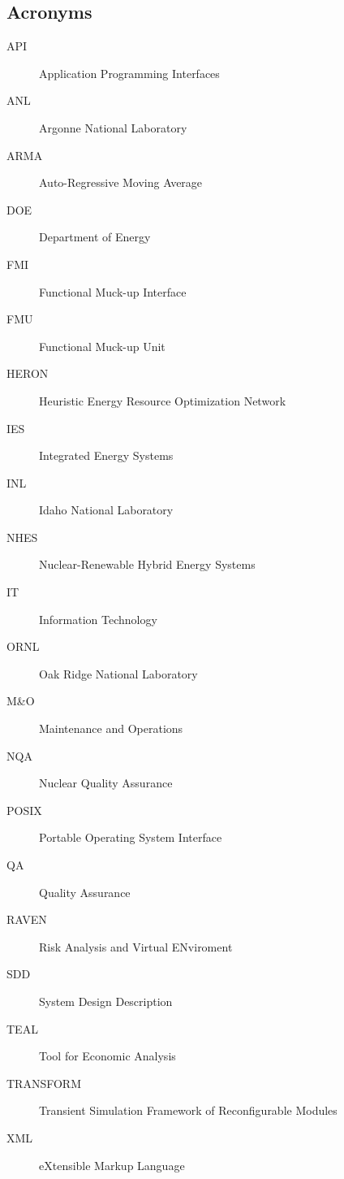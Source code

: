 \subsection{Acronyms}
\begin{description}
\item[API] Application Programming Interfaces
\item[ANL] Argonne National Laboratory
\item[ARMA] Auto-Regressive Moving Average
\item[DOE] Department of Energy
\item[FMI] Functional Muck-up Interface
\item[FMU] Functional Muck-up Unit
\item[HERON] Heuristic Energy Resource Optimization Network
\item[IES] Integrated Energy Systems
\item[INL] Idaho National Laboratory
\item[NHES] Nuclear-Renewable Hybrid Energy Systems 
\item[IT] Information Technology
\item[ORNL] Oak Ridge National Laboratory
\item[M\&O] Maintenance and Operations
\item[NQA] Nuclear Quality Assurance
\item[POSIX]  Portable Operating System Interface
\item[QA] Quality Assurance
\item[RAVEN] Risk Analysis and Virtual ENviroment
\item[SDD] System Design Description
\item[TEAL] Tool for Economic Analysis
\item[TRANSFORM]  Transient Simulation Framework of Reconfigurable Modules
\item[XML] eXtensible Markup Language 
\end{description}
